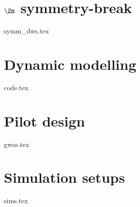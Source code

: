 




\section{\(\Zn\) symmetry-break}\label{sec:PT:symm_dws}
    {{symm_dws.tex}}


\section{Dynamic modelling}\label{sec:PT:code} %
    {{code.tex}}


\section{Pilot design}\label{sec:PT:gwas}
    {{gwas.tex}}


\section{Simulation setups}\label{sec:PT:sims}
    {{sims.tex}}






